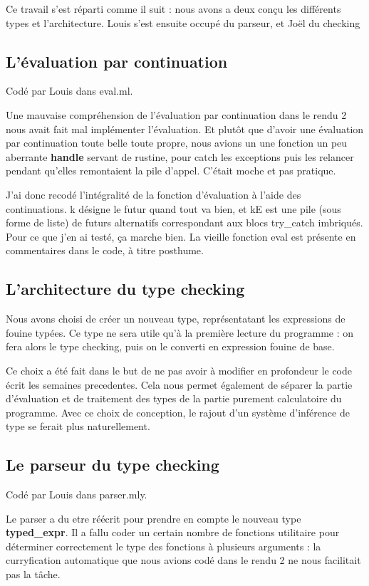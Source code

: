 \documentclass[a4paper,10pt]{report}
\begin{document}
Ce travail s'est réparti comme il suit : nous avons a deux conçu les différents types et l'architecture. Louis s'est ensuite occupé du parseur, et Jo\"el du checking

\subsection{L'évaluation par continuation}
Codé par Louis dans eval.ml.  
  
Une mauvaise compréhension de l'évaluation par continuation dans le rendu 2 nous avait fait mal implémenter l'évaluation. Et plutôt que d'avoir une évaluation par continuation toute belle toute propre, nous avions un une fonction un peu aberrante \textbf{handle} servant de rustine, pour catch les exceptions puis les relancer pendant qu'elles remontaient la pile d'appel. C'était moche et pas pratique.  
  
J'ai donc recodé l'intégralité de la fonction d'évaluation à l'aide des continuations. k désigne le futur quand tout va bien, et kE est une pile (sous forme de liste) de futurs alternatifs correspondant aux blocs try\_catch imbriqués. Pour ce que j'en ai testé, ça marche bien. La vieille fonction eval est présente en commentaires dans le code, à titre posthume.    

\subsection{L'architecture du type checking}
Nous avons choisi de créer un nouveau type, représentatant les expressions de fouine typées. Ce type ne sera utile qu'à la première lecture du programme : on fera alors le type checking, puis on le converti en expression fouine de base.

Ce choix a été fait dans le but de ne pas avoir à modifier en profondeur le code écrit les semaines precedentes. Cela nous permet également de séparer la partie d'évaluation et de traitement des types de la partie purement calculatoire du programme. Avec ce choix de conception, le rajout d'un système d'inférence de type se ferait plus naturellement.

\subsection{Le parseur du type checking}
Codé par Louis dans parser.mly.

Le parser a du etre réécrit pour prendre en compte le nouveau type \textbf{typed\_expr}. Il a fallu coder un certain nombre de fonctions utilitaire pour déterminer correctement le type des fonctions à plusieurs arguments : la curryfication automatique que nous avions codé dans le rendu 2 ne nous facilitait pas la tâche.
\end{document}
